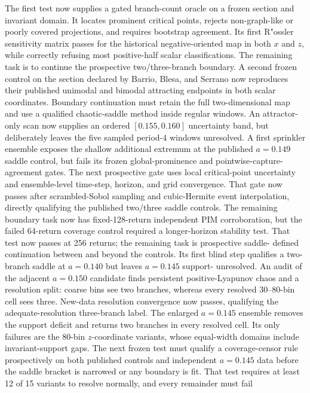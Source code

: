 The first test now supplies a gated branch-count oracle on a frozen section and
invariant domain.  It locates prominent critical points, rejects non-graph-like
or poorly covered projections, and requires bootstrap agreement.  Its first
R{"o}ssler sensitivity matrix passes for the historical negative-oriented map
in both $x$ and $z$, while correctly refusing most positive-half scalar
classifications.  The remaining task is to continue the prospective
two/three-branch boundary.  A second frozen control on the section declared by
Barrio, Blesa, and Serrano now reproduces their published unimodal and bimodal
attracting endpoints in both scalar coordinates.  Boundary continuation must
retain the full two-dimensional map and use a qualified chaotic-saddle method
inside regular windows.  An attractor-only scan now supplies an ordered
$[0.155,0.160]$ uncertainty band, but deliberately leaves the five sampled
period-4 windows unresolved.  A first sprinkler ensemble exposes the shallow
additional extremum at the published $a=0.149$ saddle control, but fails its
frozen global-prominence and pointwise-capture-agreement gates.  The next
prospective gate uses local critical-point uncertainty and ensemble-level
time-step, horizon, and grid convergence.  That gate now passes after
scrambled-Sobol sampling and cubic-Hermite event interpolation, directly
qualifying the published two/three saddle controls.  The remaining boundary
task now has fixed-128-return independent PIM corroboration, but the failed
64-return coverage control required a longer-horizon stability test.  That
test now passes at 256 returns; the remaining task is prospective saddle-
defined continuation between and beyond the controls.  Its first blind step
qualifies a two-branch saddle at $a=0.140$ but leaves $a=0.145$ support-
unresolved.  An audit of the adjacent $a=0.150$ candidate finds persistent
positive-Lyapunov chaos and a resolution split: coarse bins see two branches,
whereas every resolved 30--80-bin cell sees three.  New-data resolution
convergence now passes, qualifying the adequate-resolution three-branch label.
The enlarged $a=0.145$ ensemble removes the support deficit and returns two
branches in every resolved cell.  Its only failures are the 80-bin
$z$-coordinate variants, whose equal-width domains include invariant-support
gaps.  The next frozen test must qualify a coverage-censor rule prospectively
on both published controls and independent $a=0.145$ data before the saddle
bracket is narrowed or any boundary is fit.  That test requires
at least 12 of 15 variants to resolve normally, and every remainder must fail
